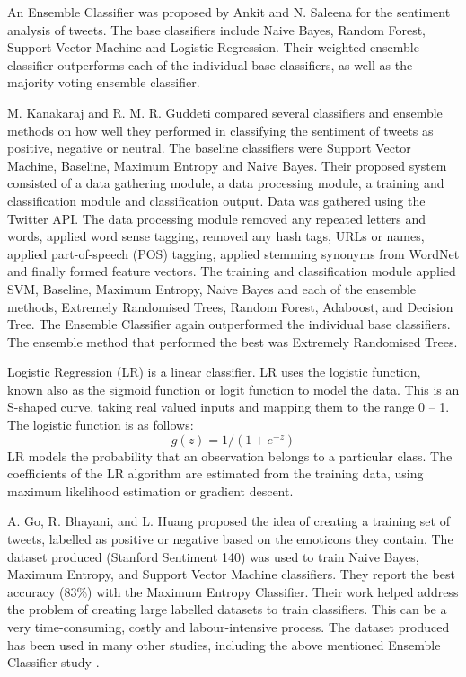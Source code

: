 An Ensemble Classifier was proposed by Ankit and N. Saleena \cite{Ankit2018} for the sentiment analysis of tweets. The base classifiers include Naive Bayes, Random Forest, Support Vector Machine and Logistic Regression. Their weighted ensemble classifier outperforms each of the individual base classifiers, as well as the majority voting ensemble classifier.

M. Kanakaraj and R. M. R. Guddeti \cite{Kanakaraj2015} compared several classifiers and ensemble methods on how well they performed in classifying the sentiment of tweets as positive, negative or neutral. The baseline classifiers were Support Vector Machine, Baseline, Maximum Entropy and Naive Bayes. Their proposed system consisted of a data gathering module, a data processing module, a training and classification module and classification output. Data was gathered using the Twitter API. The data processing module removed any repeated letters and words, applied word sense tagging, removed any hash tags, URLs or names, applied part-of-speech (POS) tagging, applied stemming synonyms from WordNet and finally formed feature vectors. The training and classification module applied SVM, Baseline, Maximum Entropy, Naive Bayes and each of the ensemble methods, Extremely Randomised Trees, Random Forest, Adaboost, and Decision Tree. The Ensemble Classifier again outperformed the individual base classifiers. The ensemble method that performed the best was Extremely Randomised Trees. 

Logistic Regression (LR) is a linear classifier. LR uses the logistic function, known also as the sigmoid function or logit function to model the data. This is an S-shaped curve, taking real valued inputs and mapping them to the range 0 – 1. The logistic function is as follows: \[g(z)=1/(1+e^{-z})\]
LR models the probability that an observation belongs to a particular class. The coefficients of the LR algorithm are estimated from the training data, using maximum likelihood estimation or gradient descent.

A. Go, R. Bhayani, and L. Huang \cite{Go2009} proposed the  idea of creating a training set of tweets, labelled as positive or negative based on the emoticons they contain. The dataset produced (Stanford Sentiment 140) was used to train Naive Bayes, Maximum Entropy, and Support Vector Machine classifiers. They report the best accuracy (83\%) with the Maximum Entropy Classifier. Their work helped address the problem of creating large labelled datasets to train classifiers. This can be a very time-consuming, costly and labour-intensive process. The dataset produced has been used in many other studies, including the above mentioned Ensemble Classifier study \cite{Ankit2018}.

